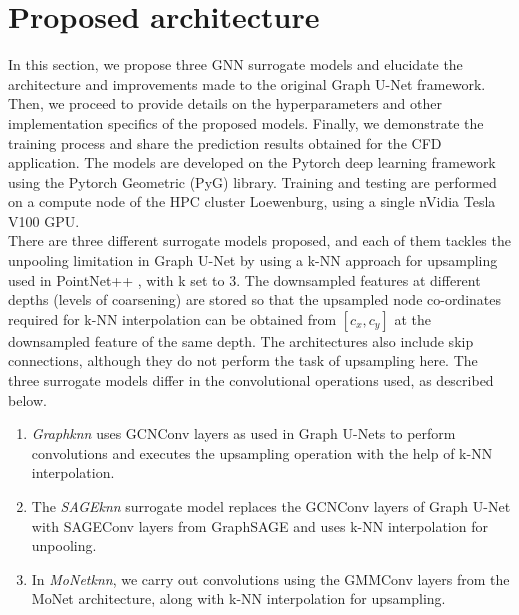 \section{Proposed architecture}
\label{proparch}
In this section, we propose three GNN surrogate models and elucidate the architecture and improvements made to the original Graph U-Net framework. Then, we proceed to provide details on the hyperparameters and other implementation specifics of the proposed models. Finally, we demonstrate the training process and share the prediction results obtained for the CFD application. The models are developed on the Pytorch deep learning framework using the Pytorch Geometric (PyG) library. Training and testing are performed on a compute node of the \gls{HPC} cluster Loewenburg, using a single nVidia Tesla V100 GPU. \\
There are three different surrogate models proposed, and each of them tackles the unpooling limitation in Graph U-Net by using a \gls{k-NN} approach for upsampling used in PointNet++ \cite{pnpp}, with k set to 3. The downsampled features at different depths (levels of coarsening) are stored so that the upsampled node co-ordinates required for k-NN interpolation can be obtained from $[c_{x}, c_{y}]$ at the downsampled feature of the same depth. The architectures also include skip connections, although they do not perform the task of upsampling here. The three surrogate models differ in the convolutional operations used, as described below. 
\begin{enumerate}
    \item \textit{Graphknn} uses GCNConv layers as used in Graph U-Nets to perform convolutions and executes the upsampling operation with the help of k-NN interpolation. 
    \item The \textit{SAGEknn} surrogate model replaces the GCNConv layers of Graph U-Net with SAGEConv layers from GraphSAGE \cite{SAGE} and uses k-NN interpolation for unpooling. 
    \item In \textit{MoNetknn}, we carry out convolutions using the GMMConv layers from the MoNet \cite{MoNet} architecture, along with k-NN interpolation for upsampling. 
\end{enumerate}
